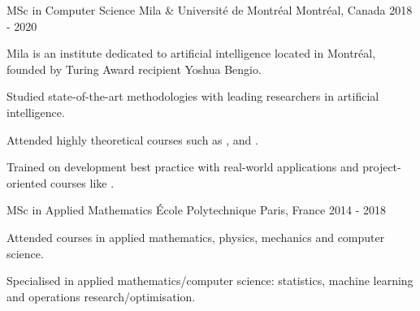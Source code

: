 \begin{cventries}
    \cventry
    {MSc in Computer Science} %
    {Mila \& Université de Montréal} %
    {Montréal, Canada} %
    {2018 - 2020} %
    {
            Mila is an institute dedicated to artificial intelligence located in Montréal, founded by Turing Award recipient Yoshua Bengio.
        \vspace{4.5mm}
        \begin{cvitems}
            \item Studied state-of-the-art methodologies with leading researchers in artificial intelligence.
            \item Attended highly theoretical courses such as ,  and .
            \item Trained on development best practice with real-world applications and project-oriented courses like .
        \end{cvitems}
    }

    \cventry
    {MSc in Applied Mathematics} %
    {École Polytechnique} %
    {Paris, France} %
    {2014 - 2018} %
    {
        \begin{cvitems} %
        \item Attended courses in applied mathematics, physics, mechanics and computer science.
        \item Specialised in applied mathematics/computer science: statistics, machine learning and operations research/optimisation.
      \end{cvitems}
    }




\end{cventries}
